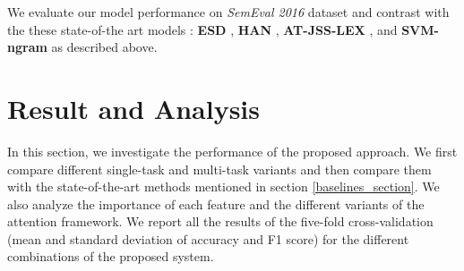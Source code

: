 \documentclass[letterpaper]{article} %
\begin{document}
\par\noindent We evaluate our model performance on \textit{SemEval 2016} dataset and contrast with the these state-of-the art models :  \textbf{ESD} \cite{vychegzhanin2021new}, \textbf{HAN} \cite{wang2020neural}, \textbf{AT-JSS-LEX} \cite{li2019multi}, and \textbf{SVM-ngram} \cite{sobhani2016detecting} as described above.



\section{Result and Analysis}
In this section, we investigate the performance of the proposed approach. We first compare different single-task and multi-task variants and then compare them with the state-of-the-art methods mentioned in section \ref{baselines_section}. We also analyze the importance of each feature and the different variants of the attention framework. We report all the results of the five-fold cross-validation (mean and standard deviation of accuracy and F1 score) for the different combinations of the proposed system.
\end{document}
